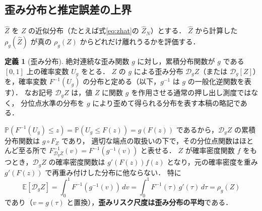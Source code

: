 \documentclass[a4paper,10pt]{jsarticle}
\theoremstyle{definition}
\newtheorem{definition}{定義}[section]
\newcommand{\Finv}{F^{-1}}
\newcommand{\E}{\mathbb{E}}
\newcommand{\Prob}{\mathbb{P}}
\newcommand{\dist}{\mathcal{D}_g}
\begin{document}
\subsection{歪み分布と推定誤差の上界}
\label{subsec:bound}
$\hat Z$ を $Z$ の近似分布（たとえば式\eqref{eq:zhat}の $\hat Z_N$）とする．
$\hat Z$ から計算した $\rho_g(\hat Z)$ が真の $\rho_g(Z)$ からどれだけ離れうるかを評価する．

\begin{definition}[歪み分布]
\label{def:distorted}
絶対連続な歪み関数 $g$ に対し，累積分布関数が $g$ である $[0,1]$ 上の確率変数 $U_g$ をとる．
$Z$ の $g$ による歪み分布 $\dist Z$（または $\mathcal{D}_g[Z]$）を，確率変数 $\Finv(U_g)$ の分布と定める（以下，$g^{-1}$ は $g$ の一般化逆関数を表す）．
なお記号 $\dist Z$ は，値 $Z$ に関数 $g$ を作用させる通常の押し出し測度ではなく，
分位点水準の分布を $g$ により歪めて得られる分布を表す本稿の略記である．
\end{definition}
$\Prob(\Finv(U_g)\le z)=\Prob(U_g\le F(z))=g(F(z))$ であるから，$\dist Z$ の累積分布関数は $g\circ F_Z$ であり，
適切な端点の取扱いの下で，その分位点関数はほとんど至る所で
$F^{-1}_{\dist Z}(v)=\Finv(g^{-1}(v))$ と表せる．
$Z$ が確率密度関数 $f$ をもつとき，$\dist Z$ の確率密度関数は $g'(F(z))f(z)$ となり，元の確率密度を重み $g'(F(z))$ で再重み付けした分布に他ならない．
特に
\begin{equation}
  \E[\dist Z]=\int_0^1\Finv(g^{-1}(v))\,dv=\int_0^1\Finv(\tau)\,g'(\tau)\,d\tau=\rho_g(Z)
  \label{eq:drm-as-mean}
\end{equation}
であり（$v=g(\tau)$ と置換），\textbf{歪みリスク尺度は歪み分布の平均}である．
\end{document}
